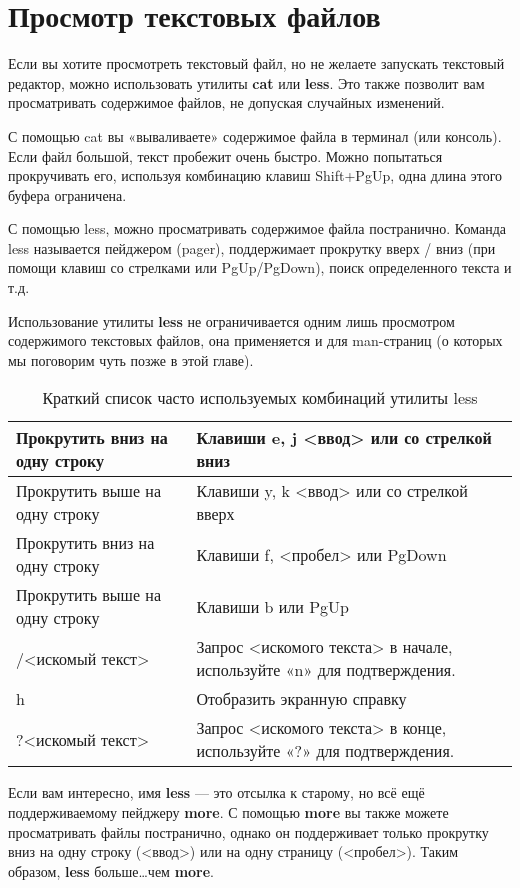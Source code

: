 \documentclass[12pt]{book}
\begin{document}
\section{Просмотр текстовых файлов}

Если вы хотите просмотреть текстовый файл, но не желаете запускать текстовый редактор, можно использовать утилиты \textbf{cat} или \textbf{less}. Это также позволит вам просматривать содержимое файлов, не допуская случайных изменений.

С помощью cat вы «вываливаете» содержимое файла в терминал (или консоль). Если файл большой, текст пробежит очень быстро. Можно попытаться прокручивать его, используя комбинацию клавиш Shift+PgUp, одна длина этого буфера ограничена.

С помощью less, можно просматривать содержимое файла постранично. Команда less называется пейджером (pager), поддержимает прокрутку вверх / вниз (при помощи клавиш со стрелками или PgUp/PgDown), поиск определенного текста и т.д.

Использование утилиты \textbf{less} не ограничивается одним лишь просмотром содержимого текстовых файлов, она применяется и для man-страниц (о которых мы поговорим чуть позже в этой главе).

\vspace{-0.5cm}
\begin{table}[!h]
\caption{Краткий список часто используемых комбинаций утилиты less}
\begin{tabular}{|m{7cm}|m{9.5cm}|}
\hline
	Прокрутить вниз на одну строку & Клавиши e, j <ввод> или со стрелкой вниз\\
\hline
	\small{Прокрутить выше на одну строку} & Клавиши y, k <ввод> или со стрелкой вверх\\
\hline
	Прокрутить вниз на одну строку & Клавиши f, <пробел> или PgDown\\
\hline
	\small{Прокрутить выше на одну строку} & Клавиши b или PgUp\\
\hline
	/<искомый текст> & Запрос <искомого текста> в начале, используйте «n» для подтверждения.\\
\hline
	h & Отобразить экранную справку\\
\hline
	?<искомый текст> & Запрос <искомого текста> в конце, используйте «?» для подтверждения.\\
\hline
\end{tabular}
\end{table}

Если вам интересно, имя \textbf{less} — это отсылка к старому, но всё ещё поддерживаемому пейджеру \textbf{more}. С помощью \textbf{more} вы также можете просматривать файлы постранично, однако он поддерживает только прокрутку вниз на одну строку (<ввод>) или на одну страницу (<пробел>). Таким образом, \textbf{less} больше\ldots чем \textbf{more}.
\end{document}

